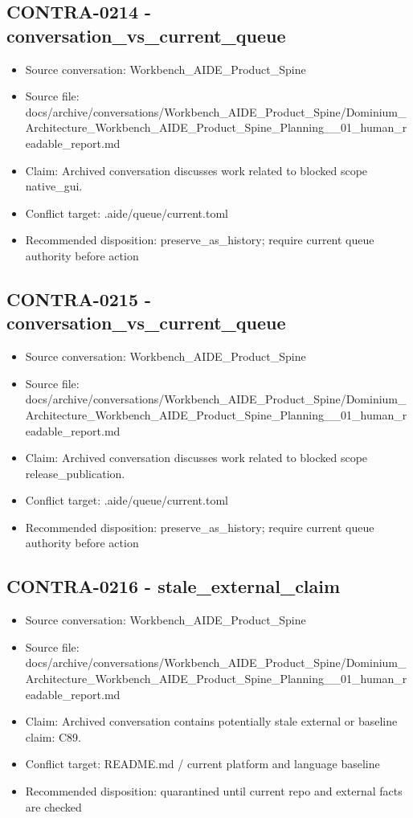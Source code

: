 \documentclass[11pt,a4paper]{report}
\begin{document}
\subsection{CONTRA-0214 - conversation\_vs\_current\_queue}

\begin{itemize}
\item Source conversation: Workbench\_AIDE\_Product\_Spine
\item Source file: docs/archive/conversations/Workbench\_AIDE\_Product\_Spine/Dominium\_Architecture\_Workbench\_AIDE\_Product\_Spine\_Planning\_\_01\_human\_readable\_report.md
\item Claim: Archived conversation discusses work related to blocked scope native\_gui.
\item Conflict target: .aide/queue/current.toml
\item Recommended disposition: preserve\_as\_history; require current queue authority before action
\end{itemize}

\subsection{CONTRA-0215 - conversation\_vs\_current\_queue}

\begin{itemize}
\item Source conversation: Workbench\_AIDE\_Product\_Spine
\item Source file: docs/archive/conversations/Workbench\_AIDE\_Product\_Spine/Dominium\_Architecture\_Workbench\_AIDE\_Product\_Spine\_Planning\_\_01\_human\_readable\_report.md
\item Claim: Archived conversation discusses work related to blocked scope release\_publication.
\item Conflict target: .aide/queue/current.toml
\item Recommended disposition: preserve\_as\_history; require current queue authority before action
\end{itemize}

\subsection{CONTRA-0216 - stale\_external\_claim}

\begin{itemize}
\item Source conversation: Workbench\_AIDE\_Product\_Spine
\item Source file: docs/archive/conversations/Workbench\_AIDE\_Product\_Spine/Dominium\_Architecture\_Workbench\_AIDE\_Product\_Spine\_Planning\_\_01\_human\_readable\_report.md
\item Claim: Archived conversation contains potentially stale external or baseline claim: C89.
\item Conflict target: README.md / current platform and language baseline
\item Recommended disposition: quarantined until current repo and external facts are checked
\end{itemize}
\end{document}
